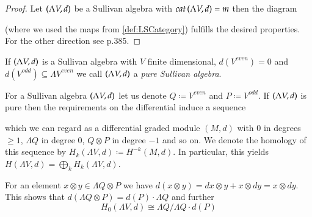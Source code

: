 \begin{proof}

 Let $(\Lambda V,d)$ be a Sullivan algebra with $cat \, (\Lambda V,d) = m$ then the diagram 

  \centerline{
  }
(where we used the maps from \ref{def:LSCategory}) fulfills the desired properties.
For the other direction see \cite{Felix2001} p.385.

% 
% 
 
\end{proof}

\begin{Definition}
 If $(\Lambda V,d)$ is a Sullivan algebra with $V$ finite dimensional, $d(V^{even}) = 0$
 and $d(V^{odd}) \subseteq \Lambda V^{even}$ we call $(\Lambda V,d)$ a \emph{pure Sullivan algebra}.
\end{Definition}

For a Sullivan algebra $(\Lambda V,d)$ let us denote $ Q \coloneqq V^{even}$ and $P \coloneqq V^{odd}$.
If $(\Lambda V,d)$ is pure then the requirements on the differential induce a sequence

\centerline{
}

which we can regard as a differential graded module $(M,d)$ with $0$ in degrees $\geq 1$, $\Lambda Q$ in degree $0$,
$Q \otimes P$ in degree $-1$ and so on.
We denote the homology of this sequence by $H_k(\Lambda V,d) \coloneqq H^{-k}(M,d)$. In particular, this yields
$ H(\Lambda V,d) = \bigoplus_k H_k(\Lambda V,d)$. \par
For an element $x \otimes y \in \Lambda Q \otimes P$ we have 
$ d( x \otimes y) = dx \otimes y + x \otimes dy = x \otimes dy$. This shows that
$d( \Lambda Q \otimes P) = d(P) \cdot \Lambda Q$ and further
$$H_0(\Lambda V, d) \cong \Lambda Q / \Lambda Q \cdot d(P)$$

